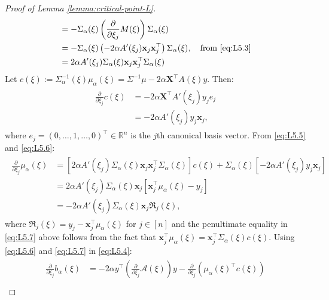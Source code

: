 \documentclass[12pt]{article}
\numberwithin{equation}{section}
\begin{document}
\begin{proof}[Proof of Lemma \ref{lemma:critical-point-L}]
\begin{align}
\begin{split}
    &= -\Sigma_{\alpha}(\xi)\left(\frac{\partial}{\partial \xi_j}M(\xi)\right)\Sigma_{\alpha}(\xi)\\
    &= -\Sigma_{\alpha}(\xi)\left(-2\alpha A'(\xi_j)\mathbf{x}_j\mathbf{x}_j^{\top}\right)\Sigma_{\alpha}(\xi),\quad \text{from \eqref{eq:L5.3}}\\
    &= 2\alpha A'(\xi_j)\Sigma_{\alpha}(\xi)\mathbf{x}_j\mathbf{x}_j^{\top}\Sigma_{\alpha}(\xi)
\end{split}
\end{align}
Let $c(\xi):= \Sigma^{-1}_{\alpha}(\xi)\mu_{\alpha}(\xi) = \Sigma^{-1}\mu - 2\alpha \mathbf{X}^{\top}A(\xi) y$. Then:
\begin{align}\label{eq:L5.6}
    \begin{split}
        \frac{\partial}{\partial \xi_j}c(\xi) &= -2\alpha \mathbf{X}^{\top}A'(\xi_j) y_j e_j\\
        &= -2\alpha A'(\xi_j) y_j \mathbf{x}_j,
    \end{split}
\end{align}
where $e_j = (0, \ldots, 1, \ldots, 0)^{\top}\in \mathbb{R}^n$ is the $j$th canonical basis vector. From \eqref{eq:L5.5} and \eqref{eq:L5.6}:
\begin{align}\label{eq:L5.7}
    \begin{split}
        \frac{\partial}{\partial \xi_j}\mu_{\alpha}(\xi) &= \left[2\alpha A'(\xi_j)\Sigma_{\alpha}(\xi)\mathbf{x}_j\mathbf{x}_j^{\top}\Sigma_{\alpha}(\xi)\right]c(\xi) + \Sigma_{\alpha}(\xi)\left[-2\alpha A'(\xi_j) y_j \mathbf{x}_j\right]\\
        &= 2\alpha A'(\xi_j)\Sigma_{\alpha}(\xi) \mathbf{x}_j\left[\mathbf{x}_{j}^{\top}\mu_{\alpha}(\xi) - y_j\right]\\
        &= -2\alpha A'(\xi_j)\Sigma_{\alpha}(\xi)\mathbf{x}_j\mathfrak{R}_j(\xi),
    \end{split}
\end{align}
where $\mathfrak{R}_j(\xi) = y_j - \mathbf{x}_j^{\top}\mu_{\alpha}(\xi)$ for $j\in [n]$ and the penultimate equality in \eqref{eq:L5.7} above follows from the fact that $\mathbf{x}_{j}^{\top}\mu_{\alpha}(\xi) = \mathbf{x}_{j}^{\top}\Sigma_{\alpha}(\xi)c(\xi)$. Using \eqref{eq:L5.6} and \eqref{eq:L5.7} in \eqref{eq:L5.4}:
\begin{align}\label{eq:L5.8}
    \begin{split}
        \frac{\partial}{\partial \xi_j}b_{\alpha}(\xi) &= -2\alpha y^{\top}\left(\frac{\partial}{\partial \xi_j}\mathcal{A}(\xi)\right) y - \frac{\partial}{\partial \xi_j}\left(\mu_{\alpha}(\xi)^{\top}c(\xi)\right)\\

\end{split}
\end{align}
\end{proof}
\end{document}
